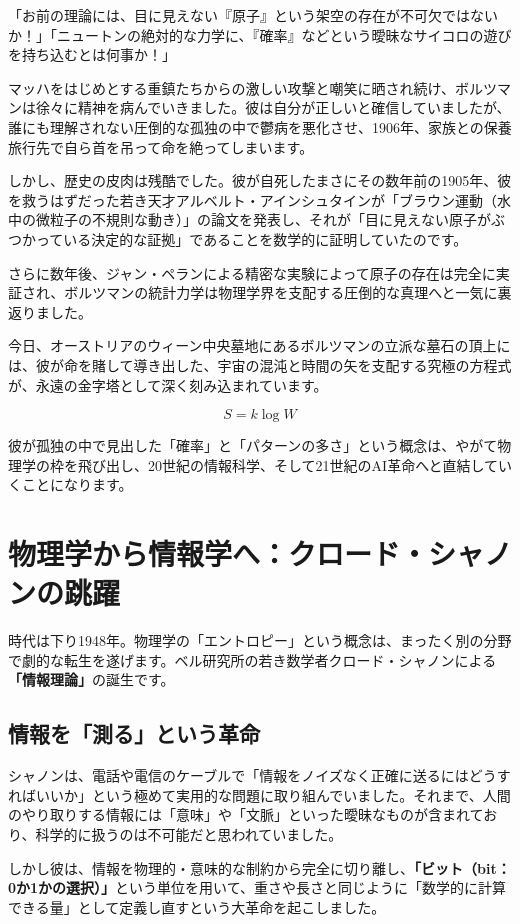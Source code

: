 「お前の理論には、目に見えない『原子』という架空の存在が不可欠ではないか！」「ニュートンの絶対的な力学に、『確率』などという曖昧なサイコロの遊びを持ち込むとは何事か！」

マッハをはじめとする重鎮たちからの激しい攻撃と嘲笑に晒され続け、ボルツマンは徐々に精神を病んでいきました。彼は自分が正しいと確信していましたが、誰にも理解されない圧倒的な孤独の中で鬱病を悪化させ、1906年、家族との保養旅行先で自ら首を吊って命を絶ってしまいます。

しかし、歴史の皮肉は残酷でした。彼が自死したまさにその数年前の1905年、彼を救うはずだった若き天才アルベルト・アインシュタインが「ブラウン運動（水中の微粒子の不規則な動き）」の論文を発表し、それが「目に見えない原子がぶつかっている決定的な証拠」であることを数学的に証明していたのです。

さらに数年後、ジャン・ペランによる精密な実験によって原子の存在は完全に実証され、ボルツマンの統計力学は物理学界を支配する圧倒的な真理へと一気に裏返りました。

今日、オーストリアのウィーン中央墓地にあるボルツマンの立派な墓石の頂上には、彼が命を賭して導き出した、宇宙の混沌と時間の矢を支配する究極の方程式が、永遠の金字塔として深く刻み込まれています。

\[
S=k\log W
\]

彼が孤独の中で見出した「確率」と「パターンの多さ」という概念は、やがて物理学の枠を飛び出し、20世紀の情報科学、そして21世紀のAI革命へと直結していくことになります。

\section{物理学から情報学へ：クロード・シャノンの跳躍}

時代は下り1948年。物理学の「エントロピー」という概念は、まったく別の分野で劇的な転生を遂げます。ベル研究所の若き数学者クロード・シャノンによる\textbf{「情報理論」}の誕生です。

\subsection{情報を「測る」という革命}

シャノンは、電話や電信のケーブルで「情報をノイズなく正確に送るにはどうすればいいか」という極めて実用的な問題に取り組んでいました。それまで、人間のやり取りする情報には「意味」や「文脈」といった曖昧なものが含まれており、科学的に扱うのは不可能だと思われていました。

しかし彼は、情報を物理的・意味的な制約から完全に切り離し、\textbf{「ビット（bit：0か1かの選択）」}という単位を用いて、重さや長さと同じように「数学的に計算できる量」として定義し直すという大革命を起こしました。


